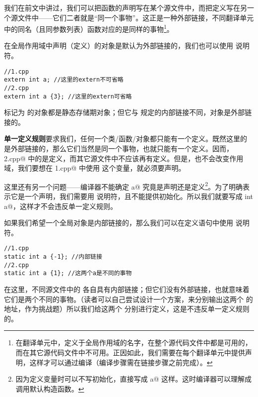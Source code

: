 我们在前文中讲过，我们可以把函数的声明写在某个源文件中，而把定义写在另一个源文件中——它们二者就是``同一个事物''。这正是一种外部链接，不同翻译单元中的同名（且同参数列表）函数对应的是同样的事物\footnote{在翻译单元中，定义于全局作用域的名字，在整个源代码文件中都是可用的，而在其它源代码文件中不可用。正因如此，我们需要在每个翻译单元中提供声明，这样才可以通过编译（编译步骤需在链接步骤之前完成）。}。\par
在全局作用域中声明（定义）的对象是默认为外部链接的，我们也可以使用 \lstinline@extern@ 说明符。
\begin{lstlisting}
//1.cpp
extern int a; //这里的extern不可省略
//2.cpp
extern int a {3}; //这里的extern可省略
\end{lstlisting}
标记为 \lstinline@extern@ 的对象都是静态存储期对象；但它与 \lstinline@static@ 规定的内部链接不同，\lstinline@extern@ 对象是外部链接的。\par
\textbf{单一定义规则}要求我们，任何一个类/函数/对象都只能有一个定义。既然这里的 \lstinline@a@ 是外部链接的，那么它们当然是同一个事物，也就只能有一个定义。因而，\lstinline@2.cpp@ 中的是定义，而其它源文件中不应该再有定义。但是，\lstinline@extern@ 也不会改变作用域，我们要想在 \lstinline@1.cpp@ 中使用 \lstinline@a@ 这个变量，就必须要声明。\par
这里还有另一个问题——编译器不能确定 \lstinline@int a@ 究竟是声明还是定义\footnote{因为定义变量时可以不写初始化，直接写成 \lstinline@int a@ 这样。这时编译器可以理解成调用默认构造函数。}。为了明确表示它是一个声明，我们需要用 \lstinline@extern@ 说明符，且不能提供初始化。所以我们就要写成 \lstinline@extern int a@，这样才不会违反单一定义规则。\par
如果我们希望一个全局对象是内部链接的，那么我们可以在定义语句中使用 \lstinline@static@ 说明符。
\begin{lstlisting}
//1.cpp
static int a {-1}; //内部链接
//2.cpp
static int a {1}; //这两个a是不同的事物
\end{lstlisting}
在这里，不同源文件中的 \lstinline@a@ 各自具有内部链接；但它们没有外部链接，也就意味着它们是两个不同的事物。（读者可以自己尝试设计一个方案，来分别输出这两个 \lstinline@a@ 的地址，作为挑战题）所以我们给这两个 \lstinline@a@ 分别进行定义，这是不违反单一定义规则的。\par
